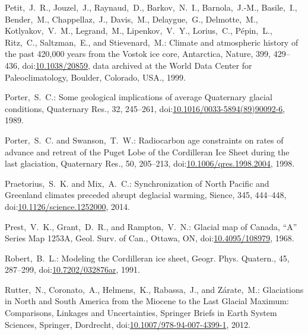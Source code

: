 \documentclass[tc, manuscript]{copernicus}
\begin{document}
\begin{thebibliography}{114}
Petit,~J.~R., Jouzel,~J., Raynaud,~D., Barkov,~N.~I., Barnola,~J.-M., Basile,~I., Bender,~M., Chappellaz,~J., Davis,~M., Delaygue,~G., Delmotte,~M., Kotlyakov,~V.~M., Legrand,~M., Lipenkov,~V.~Y., Lorius,~C., P{\'e}pin,~L., Ritz,~C., Saltzman,~E., and Stievenard,~M.: Climate and atmospheric history of the past 420,000 years from the Vostok ice core, Antarctica, Nature, 399, 429--436,
doi:\href{http://dx.doi.org/10.1038/20859}{10.1038/20859}, data archived at the World Data Center for Paleoclimatology, Boulder, Colorado, USA., 1999.


Porter,~S.~C.: Some geological implications of average Quaternary glacial conditions, Quaternary Res., 32, 245--261,
doi:\href{http://dx.doi.org/10.1016/0033-5894(89)90092-6}{10.1016/0033-5894(89)90092-6}, 1989.


Porter,~S.~C. and Swanson,~T.~W.: Radiocarbon age constraints on rates of advance and retreat of the {P}uget {L}obe of the {C}ordilleran {I}ce {S}heet during the last glaciation, Quaternary Res., 50, 205--213,
doi:\href{http://dx.doi.org/10.1006/qres.1998.2004}{10.1006/qres.1998.2004}, 1998.


Praetorius,~S.~K. and Mix,~A.~C.: Synchronization of North Pacific and Greenland climates preceded abrupt deglacial warming, Sience, 345, 444--448,
doi:\href{http://dx.doi.org/10.1126/science.1252000}{10.1126/science.1252000}, 2014.


Prest,~V.~K., Grant,~D.~R., and Rampton,~V.~N.: Glacial map of Canada, ``A'' Series Map 1253A, Geol. Surv. of Can., Ottawa, ON,
doi:\href{http://dx.doi.org/10.4095/108979}{10.4095/108979}, 1968.


Robert,~B.~L.: Modeling the Cordilleran ice sheet, G{e}ogr. Phys. Quatern., 45, 287--299,
doi:\href{http://dx.doi.org/10.7202/032876ar}{10.7202/032876ar}, 1991.


Rutter,~N., Coronato,~A., Helmens,~K., Rabassa,~J., and Z{\'a}rate,~M.: Glaciations in North and South America from the Miocene to the Last Glacial Maximum: Comparisons, Linkages and Uncertainties, Springer Briefs in Earth System Sciences, Springer, Dordrecht,
doi:\href{http://dx.doi.org/10.1007/978-94-007-4399-1}{10.1007/978-94-007-4399-1}, 2012.



\end{thebibliography}
\end{document}
